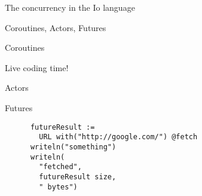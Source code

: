 \begin{frame}
  \begin{center}
    The concurrency in the Io language
  \end{center}
\end{frame}

\begin{frame}
  \begin{center}
    Coroutines, Actors, Futures
  \end{center}
\end{frame}

\begin{frame}
  \begin{center}
    Coroutines
  \end{center}
\end{frame}

\begin{frame}
  \begin{center}
    Live coding time!
  \end{center}
\end{frame}

\begin{frame}
  \begin{center}
    Actors
  \end{center}
\end{frame}

\begin{frame}
  \begin{center}
    Futures
  \end{center}
\end{frame}

\begin{frame}[fragile]
  \begin{center}
    \begin{lstlisting}
      futureResult := 
        URL with("http://google.com/") @fetch
      writeln("something")
      writeln(
        "fetched", 
        futureResult size, 
        " bytes")
    \end{lstlisting}
  \end{center}
\end{frame}
